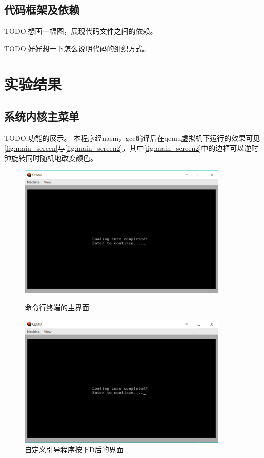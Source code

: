 \documentclass[forprint]{WHUBachelor}
\begin{document}
\section{代码框架及依赖}

TODO:想画一幅图，展现代码文件之间的依赖。

TODO:好好想一下怎么说明代码的组织方式。

\chapter{实验结果}

\section{系统内核主菜单}

TODO:功能的展示。
本程序经nasm，gcc编译后在qemu虚拟机下运行的效果可见\autoref{fig:main_screen}与\autoref{fig:main_screen2}，其中\autoref{fig:main_screen2}中的边框可以逆时钟旋转同时随机地改变颜色。
\begin{figure}[htp]
  \centering
  \begin{minipage}[t]{0.5\linewidth} 
  \centering
  \includegraphics[width=10cm]{"./figure/main_screen.png"}
  \caption{命令行终端的主界面}
  \label{fig:main_screen}
  \end{minipage}

  \begin{minipage}[t]{0.5\linewidth} 
  \centering
  \includegraphics[width=10cm]{"./figure/main_screen.png"}
  \caption{自定义引导程序按下D后的界面}
  \label{fig:main_screen2}
  \end{minipage}
\end{figure}
\end{document}
